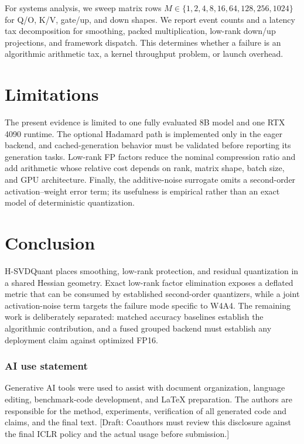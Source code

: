 \documentclass{article}
\newcommand{\method}{H-SVDQuant}
\newcommand{\draftnote}[1]{\textcolor{red!70!black}{[Draft: #1]}}
\begin{document}
For systems analysis, we sweep matrix rows $M\in\{1,2,4,8,16,64,128,256,1024\}$
for Q/O, K/V, gate/up, and down shapes. We report event counts and a latency tax
decomposition for smoothing, packed multiplication, low-rank down/up
projections, and framework dispatch. This determines whether a failure is an
algorithmic arithmetic tax, a kernel throughput problem, or launch overhead.

\section{Limitations}

The present evidence is limited to one fully evaluated 8B model and one RTX
4090 runtime. The optional Hadamard path is implemented only in the eager
backend, and cached-generation behavior must be validated before reporting its
generation tasks. Low-rank FP factors reduce the nominal compression ratio and
add arithmetic whose relative cost depends on rank, matrix shape, batch size,
and GPU architecture. Finally, the additive-noise surrogate omits a second-order
activation--weight error term; its usefulness is empirical rather than an exact
model of deterministic quantization.

\section{Conclusion}

\method{} places smoothing, low-rank protection, and residual quantization in a
shared Hessian geometry. Exact low-rank factor elimination exposes a deflated
metric that can be consumed by established second-order quantizers, while a
joint activation-noise term targets the failure mode specific to W4A4. The
remaining work is deliberately separated: matched accuracy baselines establish
the algorithmic contribution, and a fused grouped backend must establish any
deployment claim against optimized FP16.

\subsubsection*{AI use statement}
Generative AI tools were used to assist with document organization, language
editing, benchmark-code development, and LaTeX preparation. The authors are
responsible for the method, experiments, verification of all generated code and
claims, and the final text. \draftnote{Coauthors must review this disclosure
against the final ICLR policy and the actual usage before submission.}
\end{document}
